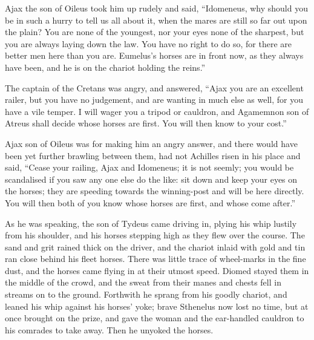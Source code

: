 Ajax the son of Oileus took him up rudely and said, “Idomeneus, why should
you be in such a hurry to tell us all about it, when the mares are still
so far out upon the plain? You are none of the youngest, nor your eyes
none of the sharpest, but you are always laying down the law. You have no
right to do so, for there are better men here than you are. Eumelus’s
horses are in front now, as they always have been, and he is on the
chariot holding the reins.”

The captain of the Cretans was angry, and answered, “Ajax you are an
excellent railer, but you have no judgement, and are wanting in much else
as well, for you have a vile temper. I will wager you a tripod or
cauldron, and Agamemnon son of Atreus shall decide whose horses are first.
You will then know to your cost.”

Ajax son of Oileus was for making him an angry answer, and there would
have been yet further brawling between them, had not Achilles risen in his
place and said, “Cease your railing, Ajax and Idomeneus; it is not seemly;
you would be scandalised if you saw any one else do the like: sit down and
keep your eyes on the horses; they are speeding towards the winning-post
and will be here directly. You will then both of you know whose horses are
first, and whose come after.”

As he was speaking, the son of Tydeus came driving in, plying his whip
lustily from his shoulder, and his horses stepping high as they flew over
the course. The sand and grit rained thick on the driver, and the chariot
inlaid with gold and tin ran close behind his fleet horses. There was
little trace of wheel-marks in the fine dust, and the horses came flying
in at their utmost speed. Diomed stayed them in the middle of the crowd,
and the sweat from their manes and chests fell in streams on to the
ground. Forthwith he sprang from his goodly chariot, and leaned his whip
against his horses’ yoke; brave Sthenelus now lost no time, but at once
brought on the prize, and gave the woman and the ear-handled cauldron to
his comrades to take away. Then he unyoked the horses.

